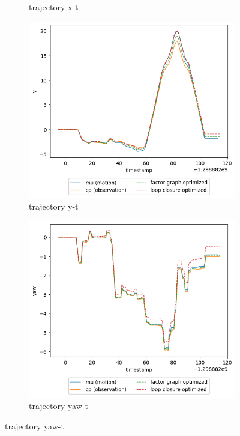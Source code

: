 \documentclass[conference]{IEEEtran}
\begin{document}
\begin{figure}[htbp]
\begin{subfigure}{0.24\textwidth}
        \caption{trajectory x-t}
        \label{fig:trj_21_x}
    \end{subfigure}
    \hfill
    \begin{subfigure}{0.24\textwidth}
        \includegraphics[width=\linewidth]{../img/trj_21_y.png}
        \caption{trajectory y-t}
        \label{fig:trj_21_y}
    \end{subfigure}
    \hfill
    \begin{subfigure}{0.24\textwidth}
        \includegraphics[width=\linewidth]{../img/trj_21_yaw.png}
        \caption{trajectory yaw-t}
        \label{fig:trj_21_yaw}
    \end{subfigure}
    

\end{figure}
\end{document}
